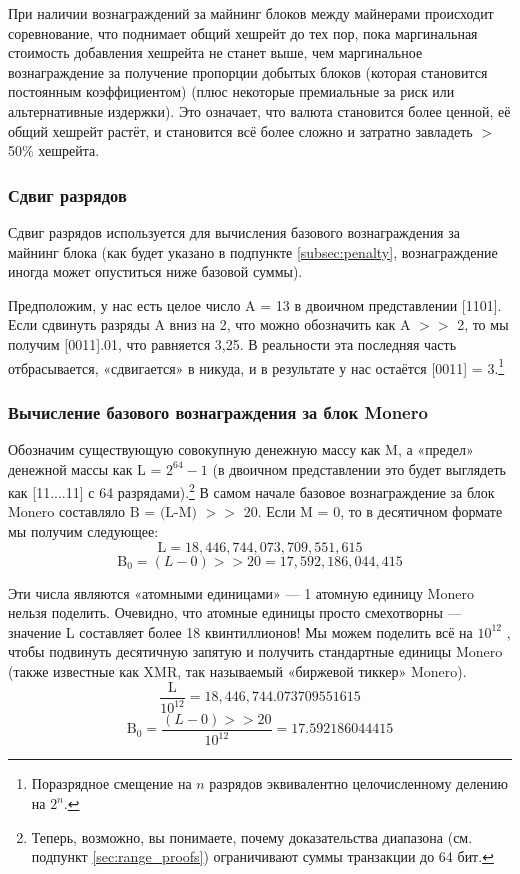 При наличии вознаграждений за майнинг блоков между майнерами происходит соревнование, что поднимает общий хешрейт до тех пор, пока маргинальная стоимость добавления хешрейта не станет выше, чем маргинальное вознаграждение за получение пропорции добытых блоков (которая становится постоянным коэффициентом) (плюс некоторые премиальные за риск или альтернативные издержки). Это означает, что валюта становится более ценной, её общий хешрейт растёт, и становится всё более сложно и затратно завладеть $>$50\% хешрейта.

\subsubsection*{Сдвиг разрядов}

Сдвиг разрядов используется для вычисления базового вознаграждения за майнинг блока (как будет указано в подпункте \ref{subsec:penalty}, вознаграждение иногда может опуститься ниже базовой суммы).

Предположим, у нас есть целое число A = 13 в двоичном представлении [1101]. Если сдвинуть разряды A вниз на 2, что можно обозначить как A $>>$ 2, то мы получим [0011].01, что равняется 3,25. В реальности эта последняя часть отбрасывается, «сдвигается» в никуда, и в результате у нас остаётся [0011] = 3.\footnote{Поразрядное смещение на $n$ разрядов эквивалентно целочисленному делению на $2^n$.}

\subsubsection*{Вычисление базового вознаграждения за блок Monero}

Обозначим существующую совокупную денежную массу как M, а «предел» денежной массы как L = $2^{64} - 1$ (в двоичном представлении это будет выглядеть как [11....11] с 64 разрядами).\footnote{Теперь, возможно, вы понимаете, почему доказательства диапазона (см. подпункт \ref{sec:range_proofs}) ограничивают суммы транзакции до 64 бит.} В самом начале базовое вознаграждение за блок Monero составляло \(\textrm{B = (L-M) $>>$ 20}\). Если M = 0, то в десятичном формате мы получим следующее:\vspace{.175cm}
\[\textrm{L} = 18,446,744,073,709,551,615\]
\[\textrm{B}_0 = (L-0) >> 20 = 17,592,186,044,415\]

Эти числа являются «атомными единицами» — 1 атомную единицу Monero нельзя поделить. Очевидно, что атомные единицы просто смехотворны — значение L составляет более 18 квинтиллионов! Мы можем поделить всё на $10^{12}$ , чтобы подвинуть десятичную запятую и получить стандартные единицы Monero (также известные как XMR, так называемый «бирже\-вой тиккер» Monero).\vspace{.15cm}
\[\frac{\textrm{L}}{10^{12}} = 18,446,744.073709551615\]
\[\textrm{B}_0 = \frac{(L-0) >> 20}{10^{12}} = 17.592186044415\]

